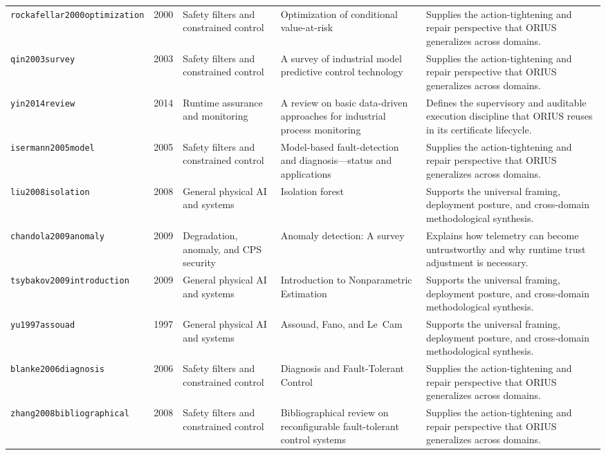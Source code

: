 \begin{longtable}{p{}p{}p{}p{}p{}}
\texttt{rockafellar2000optimization} & 2000 & Safety filters and constrained control & Optimization of conditional value-at-risk & Supplies the action-tightening and repair perspective that ORIUS generalizes across domains.\\
\texttt{qin2003survey} & 2003 & Safety filters and constrained control & A survey of industrial model predictive control technology & Supplies the action-tightening and repair perspective that ORIUS generalizes across domains.\\
\texttt{yin2014review} & 2014 & Runtime assurance and monitoring & A review on basic data-driven approaches for industrial process monitoring & Defines the supervisory and auditable execution discipline that ORIUS reuses in its certificate lifecycle.\\
\texttt{isermann2005model} & 2005 & Safety filters and constrained control & Model-based fault-detection and diagnosis---status and applications & Supplies the action-tightening and repair perspective that ORIUS generalizes across domains.\\
\texttt{liu2008isolation} & 2008 & General physical AI and systems & Isolation forest & Supports the universal framing, deployment posture, and cross-domain methodological synthesis.\\
\texttt{chandola2009anomaly} & 2009 & Degradation, anomaly, and CPS security & Anomaly detection: A survey & Explains how telemetry can become untrustworthy and why runtime trust adjustment is necessary.\\
\texttt{tsybakov2009introduction} & 2009 & General physical AI and systems & Introduction to Nonparametric Estimation & Supports the universal framing, deployment posture, and cross-domain methodological synthesis.\\
\texttt{yu1997assouad} & 1997 & General physical AI and systems & Assouad, Fano, and Le~Cam & Supports the universal framing, deployment posture, and cross-domain methodological synthesis.\\
\texttt{blanke2006diagnosis} & 2006 & Safety filters and constrained control & Diagnosis and Fault-Tolerant Control & Supplies the action-tightening and repair perspective that ORIUS generalizes across domains.\\
\texttt{zhang2008bibliographical} & 2008 & Safety filters and constrained control & Bibliographical review on reconfigurable fault-tolerant control systems & Supplies the action-tightening and repair perspective that ORIUS generalizes across domains.\\

\end{longtable}
